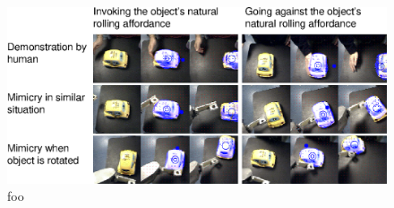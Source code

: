 


\begin{figure}[tbh]
  \centerline{\includegraphics[width=\textwidth]{fig-mimicry-awkward}}
  \caption{foo} 
\end{figure}

